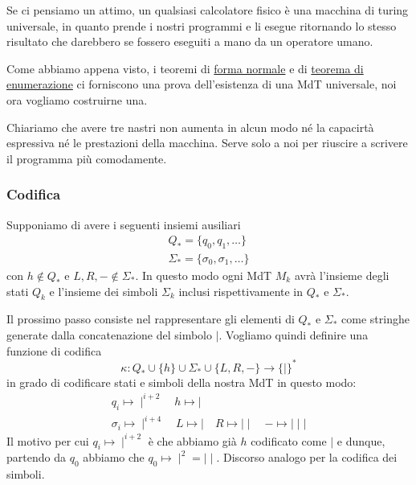 Se ci pensiamo un attimo, un qualsiasi calcolatore fisico è una
macchina di turing universale, in quanto prende i nostri
programmi e li esegue ritornando lo stesso risultato che
darebbero se fossero eseguiti a mano da un operatore umano.

Come abbiamo appena visto, i teoremi di
\hyperref[th: fn]{forma normale} e di
\hyperref[th: enum]{teorema di enumerazione} ci forniscono una
prova dell'esistenza di una MdT universale, noi ora vogliamo
costruirne una.

Chiariamo che avere tre nastri non aumenta in alcun modo né la
capacirtà espressiva né le prestazioni della macchina. Serve
solo a noi per riuscire a scrivere il programma più comodamente.

\subsubsection{Codifica}
Supponiamo di avere i seguenti insiemi ausiliari
\begin{gather*}
	Q_* = \{ q_0, q_1, \dots \} \\
	\Sigma_* = \{ \sigma_0, \sigma_1, \dots \}
\end{gather*}
con $h \notin Q_*$ e $L, R, - \notin \Sigma_*$. In questo modo
ogni MdT $M_k$ avrà l'insieme degli stati $Q_k$ e l'insieme dei
simboli $\Sigma_k$ inclusi rispettivamente in $Q_*$ e $\Sigma_*$.

Il prossimo passo consiste nel rappresentare gli elementi di
$Q_*$ e $\Sigma_*$ come stringhe generate dalla concatenazione
del simbolo $\mid$. Vogliamo quindi definire una funzione di
codifica
\[
	\kappa : Q_* \cup \{ h \} \cup \Sigma_* \cup \{ L, R, - \}
	\rightarrow \{ \mid \}^*
\]
in grado di codificare stati e simboli della nostra MdT in
questo modo:
\begin{gather*}
	q_i \mapsto \mid^{i+2}      \quad h \mapsto \mid \\
	\sigma_i \mapsto \mid^{i+4} \quad L \mapsto \mid \quad
	R \mapsto \mid \mid \quad - \mapsto \mid \mid \mid
\end{gather*}
Il motivo per cui $q_i \mapsto \mid^{i+2}$ è che abbiamo già $h$
codificato come $\mid$ e dunque, partendo da $q_0$ abbiamo che
$q_0 \mapsto \mid^2 = \mid \mid$. Discorso analogo per la
codifica dei simboli.

